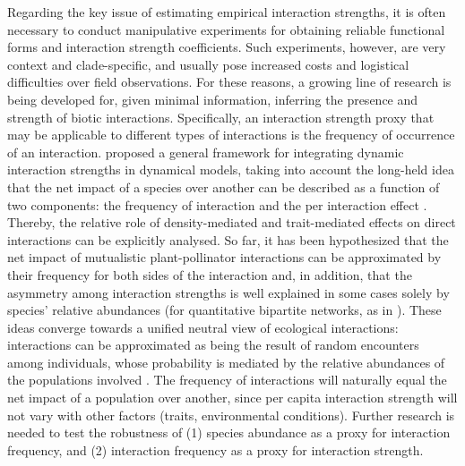 Regarding the key issue of estimating empirical interaction strengths, it is often necessary to conduct manipulative experiments for obtaining reliable functional forms and interaction strength coefficients. Such experiments, however, are very context and clade-specific, and usually pose increased costs and logistical difficulties over field observations. For these reasons, a growing line of research is being developed for, given minimal information, inferring the presence \citep{Morales-Castilla2015, Deyle2016} and strength \citep{Novak2008, Berlow2009, Vazquez2012} of biotic interactions. Specifically, an interaction strength proxy that may be applicable to different types of interactions is the frequency of occurrence of an interaction. \cite{Poisot2015} proposed a general framework for integrating dynamic interaction strengths in dynamical models, taking into account the long-held idea that the net impact of a species over another can be described as a function of two components: the frequency of interaction and the per interaction effect \citep{Vazquez2005}. Thereby, the relative role of density-mediated and trait-mediated effects on direct interactions can be explicitly analysed. So far, it has been hypothesized that the net impact of mutualistic plant-pollinator interactions can be approximated by their frequency for both sides of the interaction \citep{Vazquez2005,Vazquez2012} and, in addition, that the asymmetry among interaction strengths is well explained in some cases solely by species' relative abundances (for quantitative bipartite networks, as in \citealt{Vazquez2007}). These ideas converge towards a unified neutral view of ecological interactions: interactions can be approximated as being the result of random encounters among individuals, whose probability is mediated by the relative abundances of the populations involved \citep{Araujo2014, Canard2012, Canard2014, Cazelles2016}. The frequency of interactions will naturally equal the net impact of a population over another, since per capita interaction strength will not vary with other factors (traits, environmental conditions). Further research is needed to test the robustness of (1) species abundance as a proxy for interaction frequency, and (2) interaction frequency as a proxy for interaction strength.

